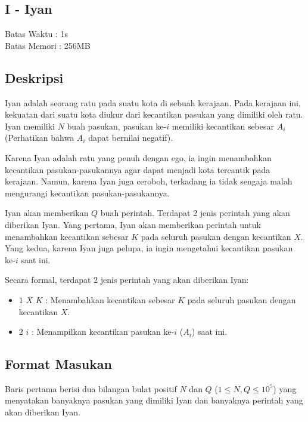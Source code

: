 \documentclass{article}
\begin{document}
\begin{center}
    \section*{I - Iyan } %
    Batas Waktu : 1s \\  %
    Batas Memori :  256MB \\ %
\end{center}

\subsection*{Deskripsi}

Iyan adalah seorang ratu pada suatu kota di sebuah kerajaan. Pada kerajaan ini, kekuatan dari suatu kota diukur dari kecantikan pasukan yang dimiliki oleh ratu. Iyan memiliki $N$ buah pasukan, pasukan ke-$i$ memiliki kecantikan sebesar $A_i$ (Perhatikan bahwa $A_i$ dapat bernilai negatif).

Karena Iyan adalah ratu yang penuh dengan ego, ia ingin menambahkan kecantikan pasukan-pasukannya agar dapat menjadi kota tercantik pada kerajaan. Namun, karena Iyan juga ceroboh, terkadang ia tidak sengaja malah mengurangi kecantikan pasukan-pasukannya.

Iyan akan memberikan $Q$ buah perintah. Terdapat 2 jenis perintah yang akan diberikan Iyan. Yang pertama, Iyan akan memberikan perintah untuk menambahkan kecantikan sebesar $K$ pada seluruh pasukan dengan kecantikan $X$. Yang kedua, karena Iyan juga pelupa, ia ingin mengetahui kecantikan pasukan ke-$i$ saat ini.

Secara formal, terdapat 2 jenis perintah yang akan diberikan Iyan:
\begin{itemize}
    \item $1$ $X$ $K$ : Menambahkan kecantikan sebesar $K$ pada seluruh pasukan dengan kecantikan $X$.
    \item $2$ $i$ : Menampilkan kecantikan pasukan ke-$i$ ($A_i$) saat ini.
\end{itemize}

\subsection*{Format Masukan}

Baris pertama berisi dua bilangan bulat positif $N$ dan $Q$ ($1 \leq N, Q \leq 10^5$) yang menyatakan banyaknya pasukan yang dimiliki Iyan dan banyaknya perintah yang akan diberikan Iyan.
\end{document}

